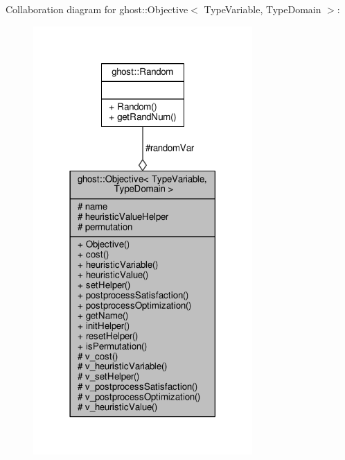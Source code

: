 Collaboration diagram for ghost\+:\+:Objective$<$ Type\+Variable, Type\+Domain $>$\+:
\nopagebreak
\begin{figure}[H]
\begin{center}
\leavevmode
\includegraphics[width=237pt]{classghost_1_1Objective__coll__graph}
\end{center}
\end{figure}
